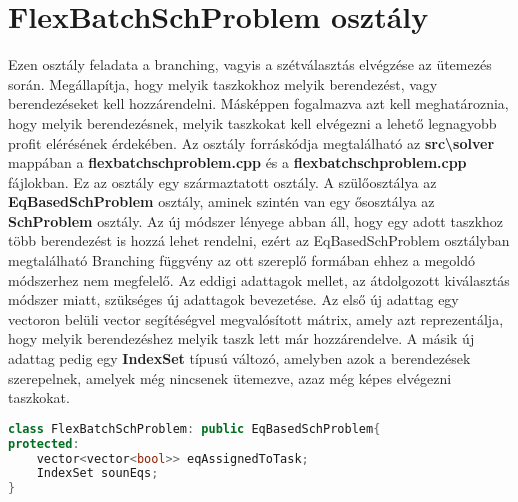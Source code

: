 \section{FlexBatchSchProblem osztály}
Ezen osztály feladata a branching, vagyis a szétválasztás elvégzése az ütemezés során. Megállapítja, hogy melyik taszkokhoz melyik berendezést, vagy berendezéseket kell hozzárendelni. Másképpen fogalmazva azt kell meghatároznia, hogy melyik berendezésnek, melyik taszkokat kell elvégezni a lehető legnagyobb profit elérésének érdekében. Az osztály forráskódja megtalálható az \textbf{src\textbackslash solver} mappában a \textbf{flexbatchschproblem.cpp} és a \textbf{flexbatchschproblem.cpp} fájlokban. Ez az osztály egy származtatott osztály. A szülőosztálya az \textbf{EqBasedSchProblem} osztály, aminek szintén van egy ősosztálya az \textbf{SchProblem} osztály. Az új módszer lényege abban áll, hogy egy adott taszkhoz több berendezést is hozzá lehet rendelni, ezért az EqBasedSchProblem osztályban megtalálható Branching függvény az ott szereplő formában ehhez a megoldó módszerhez nem megfelelő. Az eddigi adattagok mellet, az átdolgozott kiválasztás módszer miatt, szükséges új adattagok bevezetése. Az első új adattag egy vectoron belüli vector segítéségvel megvalósított mátrix, amely azt reprezentálja, hogy melyik berendezéshez melyik taszk lett már hozzárendelve. A másik új adattag pedig egy \textbf{IndexSet} típusú változó, amelyben azok a berendezések szerepelnek, amelyek még nincsenek ütemezve, azaz még képes elvégezni taszkokat.
\begin{lstlisting}[language=C++, title={FlexBatchSchProblem adattagjai}]
class FlexBatchSchProblem: public EqBasedSchProblem{
protected:
	vector<vector<bool>> eqAssignedToTask;
    IndexSet sounEqs;
}
\end{lstlisting}
